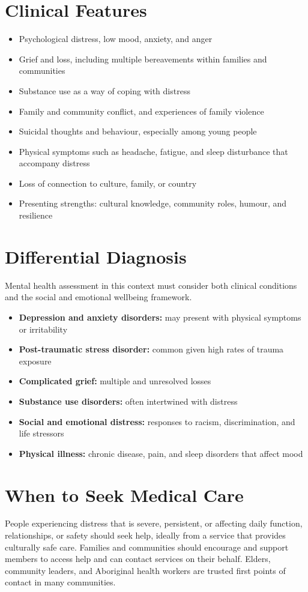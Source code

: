 \section*{Clinical Features}
\begin{itemize}
    \item Psychological distress, low mood, anxiety, and anger
    \item Grief and loss, including multiple bereavements within families and communities
    \item Substance use as a way of coping with distress
    \item Family and community conflict, and experiences of family violence
    \item Suicidal thoughts and behaviour, especially among young people
    \item Physical symptoms such as headache, fatigue, and sleep disturbance that accompany distress
    \item Loss of connection to culture, family, or country
    \item Presenting strengths: cultural knowledge, community roles, humour, and resilience
\end{itemize}

\section*{Differential Diagnosis}
Mental health assessment in this context must consider both clinical conditions and the social and emotional wellbeing framework.
\begin{itemize}
    \item \textbf{Depression and anxiety disorders:} may present with physical symptoms or irritability
    \item \textbf{Post-traumatic stress disorder:} common given high rates of trauma exposure
    \item \textbf{Complicated grief:} multiple and unresolved losses
    \item \textbf{Substance use disorders:} often intertwined with distress
    \item \textbf{Social and emotional distress:} responses to racism, discrimination, and life stressors
    \item \textbf{Physical illness:} chronic disease, pain, and sleep disorders that affect mood
\end{itemize}

\section*{When to Seek Medical Care}
People experiencing distress that is severe, persistent, or affecting daily function, relationships, or safety should seek help, ideally from a service that provides culturally safe care. Families and communities should encourage and support members to access help and can contact services on their behalf. Elders, community leaders, and Aboriginal health workers are trusted first points of contact in many communities.

